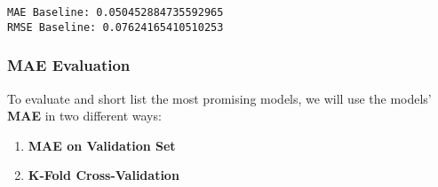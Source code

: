 \documentclass[11pt]{article}
\providecommand{\tightlist}{%
      \setlength{\itemsep}{0pt}\setlength{\parskip}{0pt}}
\begin{document}
    \begin{Verbatim}[commandchars=\\\{\}]
MAE Baseline: 0.050452884735592965
RMSE Baseline: 0.07624165410510253
    \end{Verbatim}

    \hypertarget{mae-evaluation}{%
\subsubsection{MAE Evaluation}\label{mae-evaluation}}

To evaluate and short list the most promising models, we will use the
models' \textbf{MAE} in two different ways:

\begin{enumerate}
\def\labelenumi{\arabic{enumi})}
\tightlist
\item
  \textbf{MAE on Validation Set}
\item
  \textbf{K-Fold Cross-Validation}
\end{enumerate}
\end{document}
